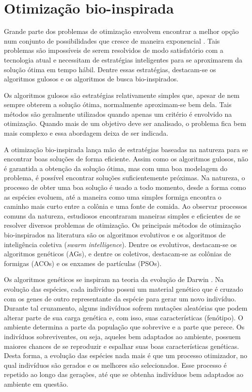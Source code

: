 \chapter[Otimização bio-inspirada]{Otimização bio-inspirada}

Grande parte dos problemas de otimização envolvem encontrar a melhor opção num conjunto de possibilidades que cresce de maneira exponencial \cite{Viggo1992}. Tais problemas são impossíveis de serem resolvidos de modo satisfatório com a tecnologia atual e necessitam de estratégias inteligentes para se aproximarem da solução ótima em tempo hábil. Dentre essas estratégias, destacam-se os algoritmos gulosos e os algoritmos de busca bio-inspirados.

Os algoritmos gulosos \cite{GreedyAlgorithms} são estratégias relativamente simples que, apesar de nem sempre obterem a solução ótima, normalmente aproximam-se bem dela. Tais métodos são geralmente utilizados quando apenas um critério é envolvido na otimização. Quando mais de um objetivo deve ser analisado, o problema fica bem mais complexo e essa abordagem deixa de ser indicada.

A otimização bio-inspirada \cite{BioInspiredOptimization} lança mão de estratégias baseadas na natureza para se encontrar boas soluções de forma eficiente. Assim como os algoritmos gulosos, não é garantida a obtenção da solução ótima, mas com uma boa modelagem do problema, é possível encontrar soluções suficientemente próximas. Na natureza, o processo de obter uma boa solução é usado a todo momento, desde a forma como as espécies evoluem, até a maneira como uma simples formiga encontra o caminho mais curto entre a colônia e uma fonte de comida. Ao observar processos comuns da natureza, estudiosos encontraram maneiras simples e eficientes de se resolver diversos problemas de otimização. Os principais métodos de otimização bio-inspirados na literatura são os algoritmos evolutivos e os algoritmos de inteligência coletiva (\textit{swarm intelligence}). Dentre os evolutivos, destacam-se os algoritmos genéticos (AGs), e dentre os coletivos, destacam-se as colônias de formigas (ACOs) e os enxames de partículas (PSOs).

Os algoritmos genéticos se inspiram na teoria da evolução de Darwin \cite{Darwin1859}. Na evolução das espécies, cada indivíduo possui um material genético que é cruzado com os genes de outro representante da espécie para gerar um novo indivíduo. Durante tal cruzamento, alguns indivíduos sofrem mutações aleatórias que podem alterar parte de sua carga genética e, com isso, suas características (fenótipo). O ambiente determina a parte da população que sobrevive e a parte que perece. Os indivíduos sobreviventes, ou seja, aqueles bem adaptados ao ambiente, possuem maiores chances de se reproduzir e espalhar suas boas características genéticas. Desta forma, a evolução das espécies nada mais é que um processo otimizador, no qual indivíduos são gerados e os melhores são selecionados. Esse processo é repetido ao longo das gerações, até que se obtenha indivíduos bem adaptados ao ambiente em questão.

